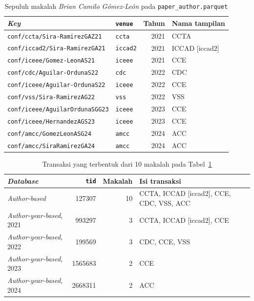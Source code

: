 \begin{table}[!htb]
\caption{Sepuluh makalah \textit{Brian Camilo Gómez-León} pada \texttt{paper\_author.parquet}}
\label{tab:instance-paper}
\footnotesize
\begin{tabular*}{\textwidth}{@{\extracolsep{\fill}}@{}llrl@{}}
\toprule
\textbf{\textit{Key}} & \textbf{\texttt{venue}} & \textbf{Tahun} & \textbf{Nama tampilan} \\
\midrule
\texttt{conf/ccta/Sira-RamirezGAZ21} & \texttt{ccta} & 2021 & CCTA \\
\texttt{conf/iccad2/Sira-RamirezGA21} & \texttt{iccad2} & 2021 & ICCAD [iccad2] \\
\texttt{conf/iceee/Gomez-LeonAS21} & \texttt{iceee} & 2021 & CCE \\
\texttt{conf/cdc/Aguilar-OrdunaS22} & \texttt{cdc} & 2022 & CDC \\
\texttt{conf/iceee/Aguilar-OrdunaS22} & \texttt{iceee} & 2022 & CCE \\
\texttt{conf/vss/Sira-RamirezAG22} & \texttt{vss} & 2022 & VSS \\
\texttt{conf/iceee/AguilarOrdunaSGG23} & \texttt{iceee} & 2023 & CCE \\
\texttt{conf/iceee/HernandezAGS23} & \texttt{iceee} & 2023 & CCE \\
\texttt{conf/amcc/GomezLeonASG24} & \texttt{amcc} & 2024 & ACC \\
\texttt{conf/amcc/SiraRamirezGA24} & \texttt{amcc} & 2024 & ACC \\
\bottomrule
\end{tabular*}
\end{table}

\begin{table}[!htb]
\caption{Transaksi yang terbentuk dari 10 makalah pada Tabel~\ref{tab:instance-paper}}
\label{tab:instance-tx}
\footnotesize
\begin{tabularx}{\textwidth}{@{}p{4.4cm}rrX@{}}
\toprule
\textbf{\textit{Database}} & \textbf{\texttt{tid}} & \textbf{Makalah} & \textbf{Isi transaksi} \\
\midrule
\textit{Author-based} & 127307 & 10 & CCTA, ICCAD [iccad2], CCE, CDC, VSS, ACC \\
\midrule
\textit{Author-year-based}, 2021 & 993297 & 3 & CCTA, ICCAD [iccad2], CCE \\
\textit{Author-year-based}, 2022 & 199569 & 3 & CDC, CCE, VSS \\
\textit{Author-year-based}, 2023 & 1565683 & 2 & CCE \\
\textit{Author-year-based}, 2024 & 2668311 & 2 & ACC \\
\bottomrule
\end{tabularx}
\end{table}

